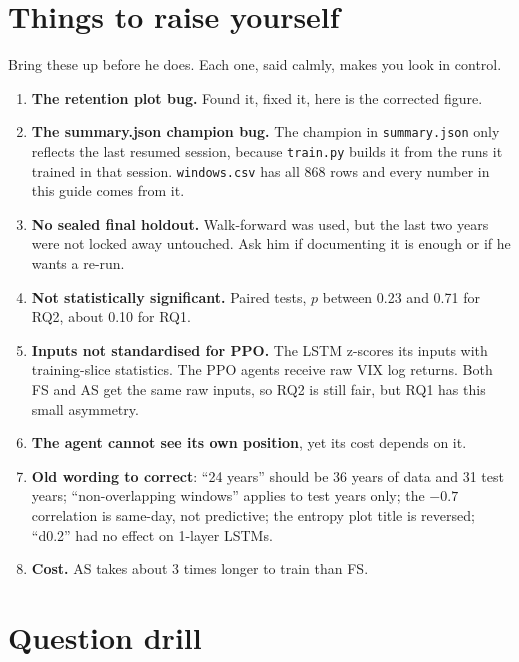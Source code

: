 \documentclass[11pt,a4paper]{article}
\begin{document}
\section{Things to raise yourself}

Bring these up before he does. Each one, said calmly, makes you look in control.

\begin{enumerate}
  \item \textbf{The retention plot bug.} Found it, fixed it, here is the corrected figure.
  \item \textbf{The summary.json champion bug.} The champion in \texttt{summary.json} only reflects
        the last resumed session, because \texttt{train.py} builds it from the runs it trained
        in that session. \texttt{windows.csv} has all 868 rows and every number in this guide
        comes from it.
  \item \textbf{No sealed final holdout.} Walk-forward was used, but the last two years were not
        locked away untouched. Ask him if documenting it is enough or if he wants a re-run.
  \item \textbf{Not statistically significant.} Paired tests, $p$ between 0.23 and 0.71 for
        RQ2, about 0.10 for RQ1.
  \item \textbf{Inputs not standardised for PPO.} The LSTM z-scores its inputs with
        training-slice statistics. The PPO agents receive raw VIX log returns. Both FS and AS
        get the same raw inputs, so RQ2 is still fair, but RQ1 has this small asymmetry.
  \item \textbf{The agent cannot see its own position}, yet its cost depends on it.
  \item \textbf{Old wording to correct}: ``24 years'' should be 36 years of data and 31 test
        years; ``non-overlapping windows'' applies to test years only; the $-0.7$ correlation is
        same-day, not predictive; the entropy plot title is reversed; ``d0.2'' had no effect on
        1-layer LSTMs.
  \item \textbf{Cost.} AS takes about 3 times longer to train than FS.
\end{enumerate}

\section{Question drill}
\end{document}
